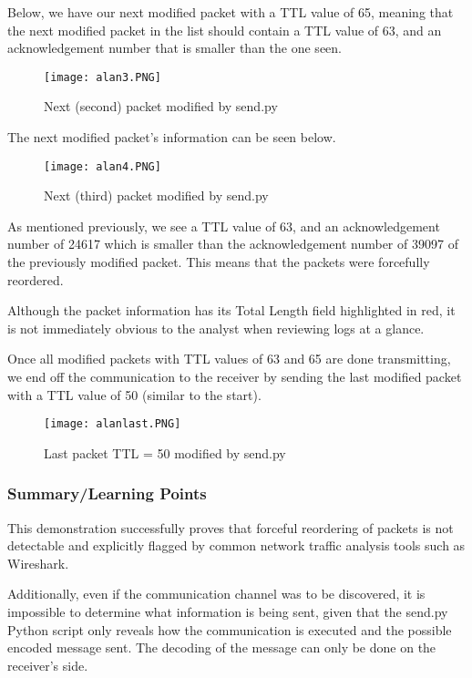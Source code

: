 \documentclass[letterpaper,twocolumn,10pt]{article}
\begin{document}
Below, we have our next modified packet with a TTL value of 65, meaning that the next modified packet in the list should contain a TTL value of 63, and an acknowledgement number that is smaller than the one seen.

\begin{figure}[H]
    \centering
    \texttt{[image: alan3.PNG]}
    \caption{Next (second) packet modified by send.py}
\end{figure}

The next modified packet’s information can be seen below.

\begin{figure}[H]
    \centering
    \texttt{[image: alan4.PNG]}
    \caption{Next (third) packet modified by send.py}
\end{figure}

As mentioned previously, we see a TTL value of 63, and an acknowledgement number of 24617 which is smaller than the acknowledgement number of 39097 of the previously modified packet. This means that the packets were forcefully reordered.

Although the packet information has its Total Length field highlighted in red, it is not immediately obvious to the analyst when reviewing logs at a glance.

Once all modified packets with TTL values of 63 and 65 are done transmitting, we end off the communication to the receiver by sending the last modified packet with a TTL value of 50 (similar to the start).

\begin{figure}[H]
    \centering
    \texttt{[image: alanlast.PNG]}
    \caption{Last packet TTL = 50 modified by send.py}
\end{figure}

\subsubsection{Summary/Learning Points}
This demonstration successfully proves that forceful reordering of packets is not detectable and explicitly flagged by common network traffic analysis tools such as Wireshark. 

Additionally, even if the communication channel was to be discovered, it is impossible to determine what information is being sent, given that the send.py Python script only reveals how the communication is executed and the possible encoded message sent. The decoding of the message can only be done on the receiver’s side.
\end{document}
